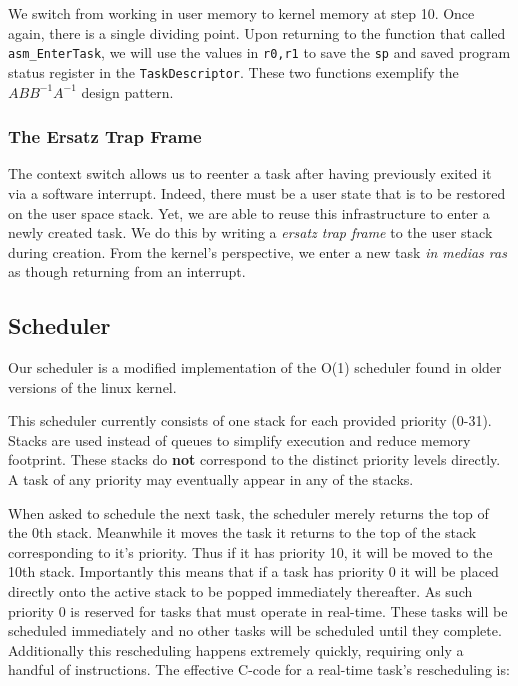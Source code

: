 \documentclass{article}
\begin{document}
We switch from working in user memory to kernel memory at step 10. Once again,
there is a single dividing point. Upon returning to the function that called
\texttt{asm\_EnterTask}, we will use the values in \texttt{r0,r1} to save the
\texttt{sp} and saved program status register in the \texttt{TaskDescriptor}.
These two functions exemplify the $ABB^{-1}A^{-1}$ design pattern.

\subsubsection*{The Ersatz Trap Frame}

The context switch allows us to reenter a task after having previously exited it
via a software interrupt. Indeed, there must be a user state that is to be
restored on the user space stack. Yet, we are able to reuse this infrastructure
to enter a newly created task. We do this by writing a \textit{ersatz trap
frame} to the user stack during creation. From the kernel's perspective, we
enter a new task \textit{in medias ras} as though returning from an interrupt.

\subsection*{Scheduler}

Our scheduler is a modified implementation of the O(1) scheduler found in older
versions of the linux kernel.

This scheduler currently consists of one stack for each provided priority
(0-31). Stacks are used instead of queues to simplify execution and reduce
memory footprint. These stacks do \textbf{not} correspond to the distinct
priority levels directly. A task of any priority may eventually appear in any of
the stacks.

When asked to schedule the next task, the scheduler merely returns the top of
the 0th stack. Meanwhile it moves the task it returns to the top of the stack
corresponding to it's priority. Thus if it has priority 10, it will be moved to
the 10th stack. Importantly this means that if a task has priority 0 it will be
placed directly onto the active stack to be popped immediately thereafter. As
such priority 0 is reserved for tasks that must operate in real-time. These
tasks will be scheduled immediately and no other tasks will be scheduled until
they complete. Additionally this rescheduling happens extremely quickly,
requiring only a handful of instructions. The effective C-code for a real-time
task's rescheduling is:
\end{document}
